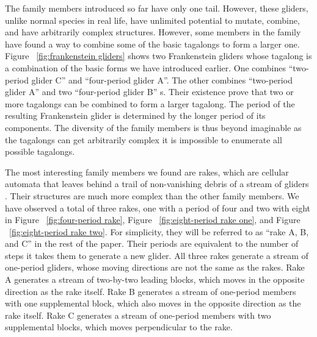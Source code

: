 \documentclass[12pt]{article}
\numberwithin{figure}{section} %
\begin{document}
The family members introduced so far have only one tail. However, these gliders, unlike normal species in real life, have unlimited potential to mutate, combine, and have arbitrarily complex structures. However, some members in the family have found a way to combine some of the basic tagalongs to form a larger one. Figure ~\ref{fig:frankenstein gliders} shows two Frankenstein gliders whose tagalong is a combination of the basic forms we have introduced earlier. One combines “two-period glider C” and “four-period glider A”. The other combines “two-period glider A” and two “four-period glider B” s. Their existence prove that two or more tagalongs can be combined to form a larger tagalong. The period of the resulting Frankenstein glider is determined by the longer period of its components. The diversity of the family members is thus beyond imaginable as the tagalongs can get arbitrarily complex it is impossible to enumerate all possible tagalongs. 

The most interesting family members we found are rakes, which are cellular automata that leaves behind a trail of non-vanishing debris of a stream of gliders \cite{rake}. Their structures are much more complex than the other family members. We have observed a total of three rakes, one with a period of four and two with eight in Figure ~\ref{fig:four-period rake}, Figure ~\ref{fig:eight-period rake one}, and Figure ~\ref{fig:eight-period rake two}. For simplicity, they will be referred to as “rake A, B, and C” in the rest of the paper. Their periods are equivalent to the number of steps it takes them to generate a new glider. All three rakes generate a stream of one-period gliders, whose moving directions are not the same as the rakes. Rake A generates a stream of two-by-two leading blocks, which moves in the opposite direction as the rake itself. Rake B generates a stream of one-period members with one supplemental block, which also moves in the opposite direction as the rake itself. Rake C generates a stream of one-period members with two supplemental blocks, which moves perpendicular to the rake. 
\end{document}
